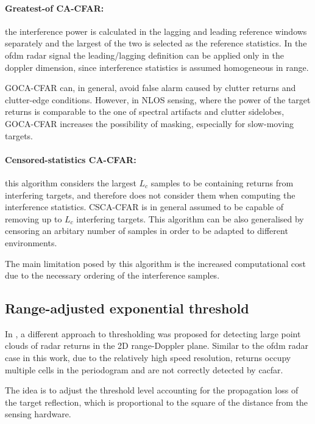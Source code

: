 \paragraph{Greatest-of CA-CFAR:}
the interference power is calculated in the lagging and leading reference windows separately and the largest of the two is selected as the reference statistics. In the \gls{ofdm} radar signal the leading/lagging definition can be applied only in the doppler dimension, since interference statistics is assumed homogeneous in range.

GOCA-CFAR can, in general, avoid false alarm caused by clutter returns and clutter-edge conditions. However, in NLOS sensing, where the power of the target returns is comparable to the one of spectral artifacts and clutter sidelobes, GOCA-CFAR increases the possibility of masking, especially for slow-moving targets.
 
 
\paragraph{Censored-statistics CA-CFAR:}
this algorithm considers the largest $L_c$ samples to be containing returns from interfering targets, and therefore does not consider them when computing the interference statistics. CSCA-CFAR is in general assumed to be capable of removing up to $L_c$ interfering targets.
This algorithm can be also generalised by censoring an arbitary number of samples in order to be adapted to different environments. 

The main limitation posed by this algorithm is the increased computational cost due to the necessary ordering of the interference samples.


\subsection{Range-adjusted exponential threshold}

	
	In \cite{Wagner_Feger_Stelzer_2017}, a different approach to thresholding was proposed for detecting large point clouds of radar returns in the 2D range-Doppler plane. Similar to the \gls{ofdm} radar case in this work, due to the relatively high speed resolution, returns occupy multiple cells in the periodogram and are not correctly detected by \gls{cacfar}.
	
	The idea is to adjust the threshold level accounting for the propagation loss of the target reflection, which is proportional to the square of the distance from the sensing hardware. 
	
